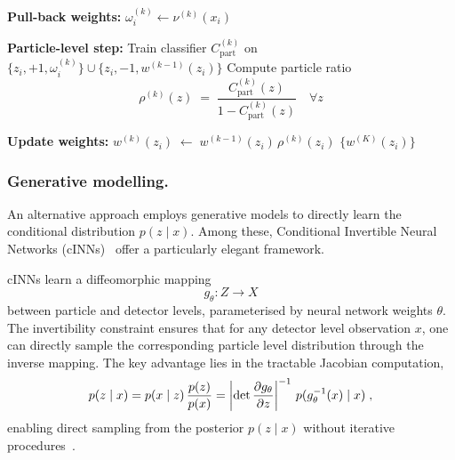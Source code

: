 \begin{algorithm}\ContinuedFloat
  \caption[]{(continued)} %
  \begin{algorithmic}[1]
  \algospacing
    \State \textbf{Pull-back weights:}
      \State $\omega_i^{(k)} \leftarrow \nu^{(k)}(x_i)$
    \EndFor
    
    \State \textbf{Particle-level step:}
    \State Train classifier $C_{\text{part}}^{(k)}$ on
      $\{z_i,+1,\omega_i^{(k)}\}\cup\{z_i,-1,w^{(k-1)}(z_i)\}$
    \State Compute particle ratio
      \[
        \rho^{(k)}(z)\;=\;\frac{C_{\text{part}}^{(k)}(z)}{1 - C_{\text{part}}^{(k)}(z)}
        \quad\forall z
      \]
    
    \State \textbf{Update weights:}
      \State $w^{(k)}(z_i)\;\leftarrow\;w^{(k-1)}(z_i)\,\rho^{(k)}(z_i)$
    \EndFor
  \EndFor
  \State \Return $\{w^{(K)}(z_i)\}$
  \end{algorithmic}
\end{algorithm}
        \subsubsection{Generative modelling.}
            An alternative approach employs generative models to directly learn the conditional distribution \(p(z \mid x)\).
            Among these, Conditional Invertible Neural Networks (cINNs)~\cite{AnanthaPadmanabha2021SolvingNetworks} offer a particularly elegant framework.
            
            cINNs learn a diffeomorphic mapping \[g_\theta: {Z} \to {X}\] between particle and detector levels, parameterised by neural network weights \(\theta\).
            The invertibility constraint ensures that for any detector level observation \(x\), one can directly sample the corresponding particle level distribution through the inverse mapping.
            The key advantage lies in the tractable Jacobian computation,
            \begin{equation}
                p(z\mid x) = p(x\mid z) \,\frac{p(z)}{p(x)} = \left|\det \pdv{g_\theta}{z} \right|^{-1}\, p(g_\theta^{-1}(x) \mid x)\;,
            \end{equation}
            enabling direct sampling from the posterior \(p(z \mid x)\) without iterative procedures~\cite{Bellagente2020InvertibleAgain}.

